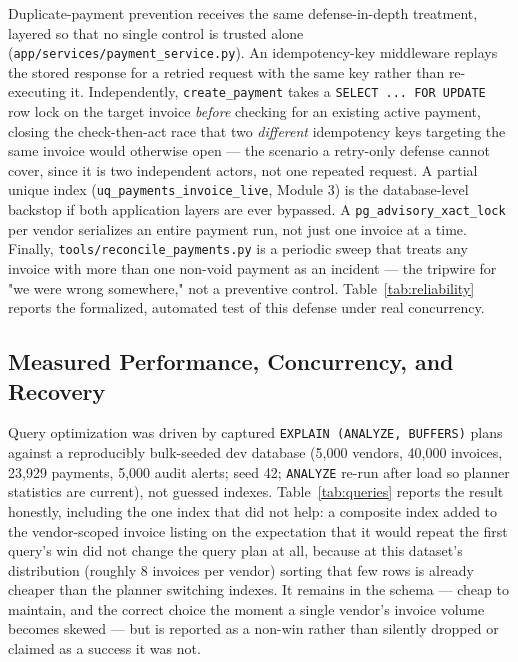 Duplicate-payment prevention receives the same defense-in-depth treatment, layered so that no single control is trusted alone (\texttt{app/services/payment\_service.py}). An idempotency-key middleware replays the stored response for a retried request with the same key rather than re-executing it. Independently, \texttt{create\_payment} takes a \texttt{SELECT ... FOR UPDATE} row lock on the target invoice \emph{before} checking for an existing active payment, closing the check-then-act race that two \emph{different} idempotency keys targeting the same invoice would otherwise open — the scenario a retry-only defense cannot cover, since it is two independent actors, not one repeated request. A partial unique index (\texttt{uq\_payments\_invoice\_live}, Module 3) is the database-level backstop if both application layers are ever bypassed. A \texttt{pg\_advisory\_xact\_lock} per vendor serializes an entire payment run, not just one invoice at a time. Finally, \texttt{tools/reconcile\_payments.py} is a periodic sweep that treats any invoice with more than one non-void payment as an incident — the tripwire for "we were wrong somewhere," not a preventive control. Table~\ref{tab:reliability} reports the formalized, automated test of this defense under real concurrency.

\subsection{Measured Performance, Concurrency, and Recovery}\label{sec:system-performance}

Query optimization was driven by captured \texttt{EXPLAIN (ANALYZE, BUFFERS)} plans against a reproducibly bulk-seeded dev database (5{,}000 vendors, 40{,}000 invoices, 23{,}929 payments, 5{,}000 audit alerts; seed 42; \texttt{ANALYZE} re-run after load so planner statistics are current), not guessed indexes. Table~\ref{tab:queries} reports the result honestly, including the one index that did not help: a composite index added to the vendor-scoped invoice listing on the expectation that it would repeat the first query's win did not change the query plan at all, because at this dataset's distribution (roughly 8 invoices per vendor) sorting that few rows is already cheaper than the planner switching indexes. It remains in the schema — cheap to maintain, and the correct choice the moment a single vendor's invoice volume becomes skewed — but is reported as a non-win rather than silently dropped or claimed as a success it was not.


